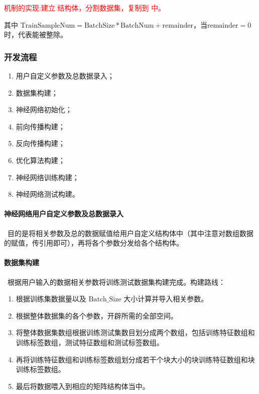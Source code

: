 \textcolor{red}{ 机制的实现:建立  结构体，分割数据集，复制到    中。}

其中 $\text{TrainSampleNum} = \text{BatchSize}*\text{BatchNum}+\text{remainder}$，当$\text{remainder}=0$时，代表能被整除。

\subsubsection{开发流程}
\begin{enumerate}
  \item 用户自定义参数及总数据录入；
  \item 数据集构建；
  \item 神经网络初始化；
  \item 前向传播构建；
  \item 反向传播构建；
  \item 优化算法构建；
  \item 神经网络训练构建；
  \item 神经网络测试构建。
\end{enumerate}


\paragraph{神经网络用户自定义参数及总数据录入}~目的是将相关参数及总的数据赋值给用户自定义结构体中（其中注意对数组数据的赋值，传引用即可），再将各个参数分发给各个结构体。


\paragraph{数据集构建} ~根据用户输入的数据相关参数将训练测试数据集构建完成。构建路线：
\begin{enumerate}
  \item 根据训练集数据量以及 $\text{Batch\_Size}$ 大小计算并导入相关参数。
  \item 根据整体数据集的各个参数，开辟所需的全部空间。
  \item 将整体数据集数组根据训练测试集数目划分成两个数组，包括训练特征数组和训练标签数组，测试特征数组和测试标签数组。
  \item 再将训练特征数组和训练标签数组划分成若干个块大小的块训练特征数组和块训练标签数组。
  \item 最后将数据喂入到相应的矩阵结构体当中。
\end{enumerate}


